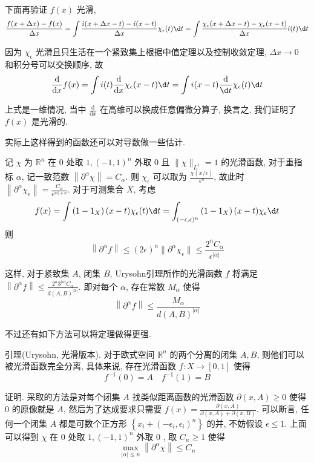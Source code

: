 \documentclass[options]{article}
\begin{document}
下面再验证 $f(x)$ 光滑,
\[
		\frac{f(x+\Delta x)-f(x)}{\Delta x}=\int \frac{i(x+\Delta x-t)-i(x-t)}{\Delta x} \chi_\epsilon(t) \d t=\int \frac{\chi_\epsilon(x+\Delta x-t)-\chi_\epsilon(x-t)}{\Delta x} i(t) \d t
\]

因为 $\chi_\epsilon$ 光滑且只生活在一个紧致集上根据中值定理以及控制收敛定理, $\Delta x \rightarrow 0$ 和积分号可以交换顺序, 故
\[
		\frac{\mathrm{d}}{\mathrm{d} x} f(x)=\int i(t) \frac{\mathrm{d}}{\mathrm{d} x} \chi_\epsilon(x-t) \d t=\int i(x-t) \frac{\mathrm{d}}{\d t} \chi_\epsilon(t) \d t
\]

上式是一维情况, 当中 $\frac{\mathrm{d}}{\mathrm{d} x}$ 在高维可以换成任意偏微分算子, 换言之, 我们证明了 $f(x)$ 是光滑的.
\begin{remark}
	实际上这样得到的函数还可以对导数做一些估计.
\end{remark}

记 $\chi$ 为 $\mathbb{R}^n$ 在 $0$ 处取 $1,(-1,1)^n$ 外取 $0$ 且 $\|\chi\|_{L^1}=1$ 的光滑函数, 对于重指标 $\alpha$, 记一致范数 $\left\|\partial^\alpha \chi\right\|=C_\alpha$. 则 $\chi_\epsilon$ 可以取为 $\frac{\chi(x /
	\epsilon)}{\epsilon^n}$, 故此时 $\left\|\partial^\alpha \chi_\epsilon\right\|=\frac{C_\alpha}{\epsilon^{|\alpha|+n}}$. 对于可测集合 $X$, 考虑
\[
		f(x)=\int\left(1-1_X\right)(x-t) \chi_\epsilon(t) \d t=\int_{(-\epsilon,\epsilon)^n}\left(1-1_X\right)(x-t) \chi_\epsilon \d t
\]
则
\[
		\left\|\partial^\alpha f\right\| \leq(2 \epsilon)^n\| \partial^\alpha \chi_\epsilon \| \leq \frac{2^n C_\alpha}{\epsilon^{|\alpha|}}
\]

这样, 对于紧致集 $A$, 闭集 $B$, Urysohn引理所作的光滑函数 $f$ 将满足 $\left\|\partial^\alpha f\right\| \leq \frac{2^n 3^{|\alpha|} C_\alpha}{d(A, B)^{|\alpha|}}$. 即对每个
$\alpha$, 存在常数 $M_\alpha$ 使得
\[
		\left\|\partial^\alpha f\right\| \leq \frac{M_\alpha}{d(A, B)^{|\alpha|}}
\]
\begin{remark}
	不过还有如下方法可以将定理做得更强.

	\hrulefill

	引理(Urysohn, 光滑版本). 对于欧式空间 $\mathbb{R}^n$ 的两个分离的闭集 $A, B$, 则他们可以被光滑函数完全分离, 具体来说, 存在光滑函数 $f: X \rightarrow[0,1]$ 使得
	\[
			f^{-1}(0)=A \quad f^{-1}(1)=B
	\]
\end{remark}
证明. 采取的方法是对每个闭集 $A$ 找类似距离函数的光滑函数 $\partial(x, A) \geq 0$ 使得 $0$ 的原像就是 $A$, 然后为了达成要求只需要 $f(x)=\frac{\partial(x, A)}{\partial(x, A)+\partial(x, B)}$. 可以断言, 任何一个闭集 $A$ 都是可数个正方形 $\left\{x_i+\left(-\epsilon_i,
\epsilon_i\right)^n\right\}$ 的并, 不妨假设 $\epsilon \leq 1$. 上面可以得到 $\chi$ 在 $0$ 处取
$1,(-1,1)^n$ 外取 $0$ , 取 $C_n \geq 1$ 使得
\[
		\max _{|\alpha| \leq n}\left\|\partial^\alpha \chi\right\| \leq C_n
\]
\end{document}
